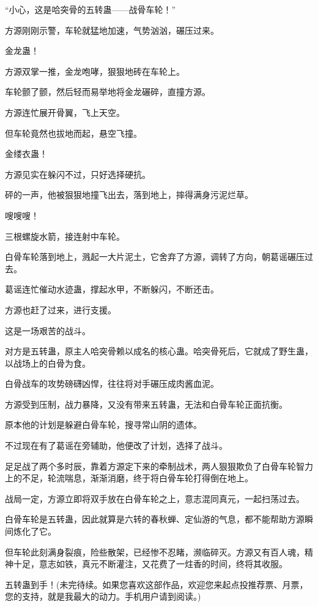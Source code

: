\begin{this_body}
“小心，这是哈突骨的五转蛊——战骨车轮！”

方源刚刚示警，车轮就猛地加速，气势汹汹，碾压过来。

金龙蛊！

方源双掌一推，金龙咆哮，狠狠地砖在车轮上。

车轮颤了颤，然后轻而易举地将金龙碾碎，直撞方源。

方源连忙展开骨翼，飞上天空。

但车轮竟然也拔地而起，悬空飞撞。

金缕衣蛊！

方源见实在躲闪不过，只好选择硬抗。

砰的一声，他被狠狠地撞飞出去，落到地上，摔得满身污泥烂草。

嗖嗖嗖！

三根螺旋水箭，接连射中车轮。

白骨车轮落到地上，溅起一大片泥土，它舍弃了方源，调转了方向，朝葛谣碾压过去。

葛谣连忙催动水迹蛊，撑起水甲，不断躲闪，不断还击。

方源也赶了过来，进行支援。

这是一场艰苦的战斗。

对方是五转蛊，原主人哈突骨赖以成名的核心蛊。哈突骨死后，它就成了野生蛊，以战场上的白骨为食。

白骨战车的攻势磅礴凶悍，往往将对手碾压成肉酱血泥。

方源受到压制，战力暴降，又没有带来五转蛊，无法和白骨车轮正面抗衡。

原本他的计划是躲避白骨车轮，搜寻常山阴的遗体。

不过现在有了葛谣在旁辅助，他便改了计划，选择了战斗。

足足战了两个多时辰，靠着方源定下来的牵制战术，两人狠狠欺负了白骨车轮智力上的不足，轮流喘息，渐渐消磨，终于将白骨车轮打得倒在地上。

战局一定，方源立即将双手放在白骨车轮之上，意志混同真元，一起扫荡过去。

白骨车轮是五转蛊，因此就算是六转的春秋蝉、定仙游的气息，都不能帮助方源瞬间炼化了它。

但车轮此刻满身裂痕，险些散架，已经惨不忍睹，濒临碎灭。方源又有百人魂，精神十足，意志如铁，真元不断灌注，又花费了一炷香的时间，终将其收服。

五转蛊到手！(未完待续。如果您喜欢这部作品，欢迎您来起点投推荐票、月票，您的支持，就是我最大的动力。手机用户请到阅读。)

\end{this_body}

